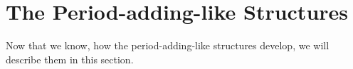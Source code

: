 \section{The Period-adding-like Structures}
\label{sec:add.add}

Now that we know, how the period-adding-like structures develop, we will describe them in this section.






